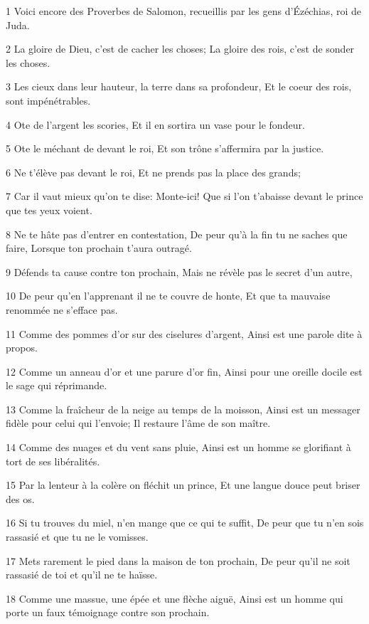 \par 1 Voici encore des Proverbes de Salomon, recueillis par les gens d'Ézéchias, roi de Juda.
\par 2 La gloire de Dieu, c'est de cacher les choses; La gloire des rois, c'est de sonder les choses.
\par 3 Les cieux dans leur hauteur, la terre dans sa profondeur, Et le coeur des rois, sont impénétrables.
\par 4 Ote de l'argent les scories, Et il en sortira un vase pour le fondeur.
\par 5 Ote le méchant de devant le roi, Et son trône s'affermira par la justice.
\par 6 Ne t'élève pas devant le roi, Et ne prends pas la place des grands;
\par 7 Car il vaut mieux qu'on te dise: Monte-ici! Que si l'on t'abaisse devant le prince que tes yeux voient.
\par 8 Ne te hâte pas d'entrer en contestation, De peur qu'à la fin tu ne saches que faire, Lorsque ton prochain t'aura outragé.
\par 9 Défends ta cause contre ton prochain, Mais ne révèle pas le secret d'un autre,
\par 10 De peur qu'en l'apprenant il ne te couvre de honte, Et que ta mauvaise renommée ne s'efface pas.
\par 11 Comme des pommes d'or sur des ciselures d'argent, Ainsi est une parole dite à propos.
\par 12 Comme un anneau d'or et une parure d'or fin, Ainsi pour une oreille docile est le sage qui réprimande.
\par 13 Comme la fraîcheur de la neige au temps de la moisson, Ainsi est un messager fidèle pour celui qui l'envoie; Il restaure l'âme de son maître.
\par 14 Comme des nuages et du vent sans pluie, Ainsi est un homme se glorifiant à tort de ses libéralités.
\par 15 Par la lenteur à la colère on fléchit un prince, Et une langue douce peut briser des os.
\par 16 Si tu trouves du miel, n'en mange que ce qui te suffit, De peur que tu n'en sois rassasié et que tu ne le vomisses.
\par 17 Mets rarement le pied dans la maison de ton prochain, De peur qu'il ne soit rassasié de toi et qu'il ne te haïsse.
\par 18 Comme une massue, une épée et une flèche aiguë, Ainsi est un homme qui porte un faux témoignage contre son prochain.
